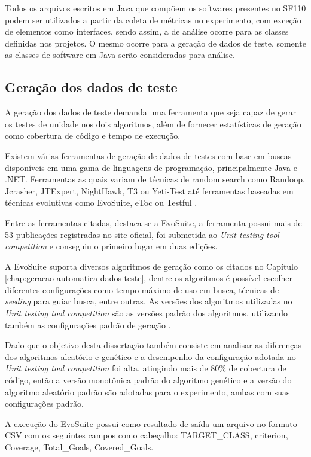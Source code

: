 \documentclass[
	12pt,				%
	oneside,			%
	a4paper,			%
	english,			%
	brazil				%
	]{abntex2ppgsi}
\begin{document}
Todos os arquivos escritos em Java que compõem os softwares presentes no SF110 podem ser utilizados a partir da coleta de métricas no experimento, com exceção de elementos como interfaces, sendo assim, a de análise ocorre para as classes definidas nos projetos. O mesmo ocorre para a geração de dados de teste, somente as classes de software em Java serão consideradas para análise.

\subsection{Geração dos dados de teste}

A geração dos dados de teste demanda uma ferramenta que seja capaz de gerar os testes de unidade nos dois algoritmos, além de fornecer estatísticas de geração como cobertura de código e tempo de execução.

Existem várias ferramentas de geração de dados de testes com base em buscas disponíveis em uma gama de linguagens de programação, principalmente Java e .NET. Ferramentas as quais variam de técnicas de random search como Randoop, Jcrasher, JTExpert, NightHawk, T3 ou Yeti-Test até ferramentas baseadas em técnicas evolutivas como EvoSuite, eToc ou Testful \cite{shamriski20151115}. 

Entre as ferramentas citadas, destaca-se a EvoSuite, a ferramenta possui mais de 53 publicações registradas no site oficial, foi submetida ao \textit{Unit testing tool competition} e conseguiu o primeiro lugar em duas edições.

A EvoSuite suporta diversos algoritmos de geração como os citados no Capítulo \ref{chap:geracao-automatica-dados-teste}, dentre os algoritmos é possível escolher diferentes configurações como tempo máximo de uso em busca, técnicas de \textit{seeding} para guiar busca, entre outras. As versões dos algoritmos utilizadas no \textit{Unit testing tool competition} são as versões padrão dos algoritmos, utilizando também as configurações padrão de geração \cite{shamriski20151115}. 

Dado que o objetivo desta dissertação também consiste em analisar  as diferenças dos algoritmos aleatório e genético  e a desempenho da configuração adotada no \textit{Unit testing tool competition} foi alta, atingindo mais de 80\% de cobertura de código, então a versão monotônica padrão do algoritmo genético e a versão do algoritmo aleatório padrão são adotadas para o experimento, ambas com suas configurações padrão.

A execução do EvoSuite possui como resultado de saída um arquivo no formato CSV com os seguintes campos como cabeçalho: TARGET\_CLASS, criterion, Coverage, Total\_Goals, Covered\_Goals. 
\end{document}
